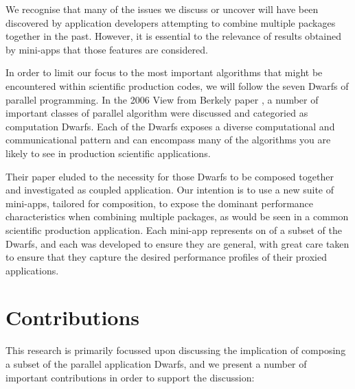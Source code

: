 \documentclass[runningheads,a4paper]{llncs}
\begin{document}
We recognise that many of the issues we discuss or uncover will have been discovered by application developers attempting to combine multiple packages together in the past. However, it is essential to the relevance of results obtained by mini-apps that those features are considered.

In order to limit our focus to the most important algorithms that might be encountered within scientific production codes, we will follow the seven Dwarfs of parallel programming. In the 2006 View from Berkely paper \cite{Asanovic2006}, a number of important classes of parallel algorithm were discussed and categoried as computation Dwarfs. Each of the Dwarfs exposes a diverse computational and communicational pattern and can encompass many of the algorithms you are likely to see in production scientific applications.  

Their paper eluded to the necessity for those Dwarfs to be composed together and investigated as coupled application. Our intention is to use a new suite of mini-apps, tailored for composition, to expose the dominant performance characteristics when combining multiple packages, as would be seen in a common scientific production application. Each mini-app represents on of a subset of the Dwarfs, and each was developed to ensure they are general, with great care taken to ensure that they capture the desired performance profiles of their proxied applications.

\section{Contributions}

This research is primarily focussed upon discussing the implication of composing a subset of the parallel application Dwarfs, and we present a number of important contributions in order to support the discussion:
\end{document}
